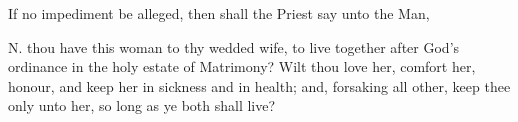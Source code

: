 \begin{rubric}
If no impediment be alleged, then shall the Priest say unto the Man,
\end{rubric}

N.  thou have this woman to thy wedded wife, to live together after God's ordinance in the holy estate of Matrimony?
Wilt thou love her, comfort her, honour, and keep her in sickness and in health; and, forsaking all other, keep thee only unto her, so long as ye both shall live?


